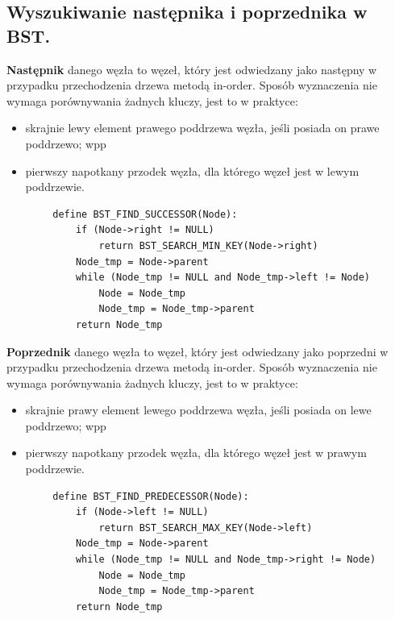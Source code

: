 \documentclass[12pt]{article}
\begin{document}
    \subsection{Wyszukiwanie następnika i poprzednika w BST.}
    \begin{definition}
        \textbf{Następnik} danego węzła to węzeł, który jest odwiedzany jako następny w przypadku przechodzenia drzewa
        metodą in-order. Sposób wyznaczenia nie wymaga porównywania żadnych kluczy, jest to w praktyce:
        \begin{itemize}
            \item skrajnie lewy element prawego poddrzewa węzła, jeśli posiada on prawe poddrzewo; wpp
            \item pierwszy napotkany przodek węzła, dla którego węzeł jest w lewym poddrzewie.
        \end{itemize}
    \end{definition}

    \begin{verbatim}
        define BST_FIND_SUCCESSOR(Node):
            if (Node->right != NULL)
                return BST_SEARCH_MIN_KEY(Node->right)
            Node_tmp = Node->parent
            while (Node_tmp != NULL and Node_tmp->left != Node)
                Node = Node_tmp
                Node_tmp = Node_tmp->parent
            return Node_tmp
    \end{verbatim}


    \begin{definition}
        \textbf{Poprzednik} danego węzła to węzeł, który jest odwiedzany jako poprzedni w przypadku przechodzenia drzewa
        metodą in-order. Sposób wyznaczenia nie wymaga porównywania żadnych kluczy, jest to w praktyce:
        \begin{itemize}
            \item skrajnie prawy element lewego poddrzewa węzła, jeśli posiada on lewe poddrzewo; wpp
            \item pierwszy napotkany przodek węzła, dla którego węzeł jest w prawym poddrzewie.
        \end{itemize}
    \end{definition}

    \begin{verbatim}
        define BST_FIND_PREDECESSOR(Node):
            if (Node->left != NULL)
                return BST_SEARCH_MAX_KEY(Node->left)
            Node_tmp = Node->parent
            while (Node_tmp != NULL and Node_tmp->right != Node)
                Node = Node_tmp
                Node_tmp = Node_tmp->parent
            return Node_tmp
    \end{verbatim}
\end{document}
